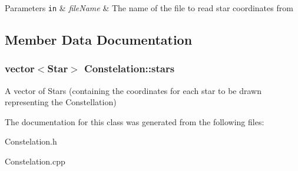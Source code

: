 \begin{DoxyParams}[1]{Parameters}
\mbox{\tt in}  & {\em file\-Name} & The name of the file to read star coordinates from \\
\hline
\end{DoxyParams}


\subsection{Member Data Documentation}
\hypertarget{classConstelation_a71d208ee2a6b57c32f28044ee7acad55}{
\subsubsection[{stars}]{\setlength{\rightskip}{0pt plus 5cm}vector$<${\bf Star}$>$ Constelation\-::stars}}\label{classConstelation_a71d208ee2a6b57c32f28044ee7acad55}
A vector of Stars (containing the coordinates for each star to be drawn representing the Constellation) 

The documentation for this class was generated from the following files\-:\begin{DoxyCompactItemize}
\item 
Constelation.\-h\item 
Constelation.\-cpp\end{DoxyCompactItemize}
